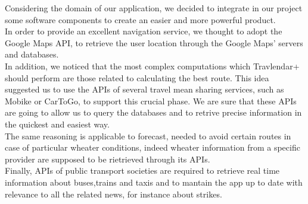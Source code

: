 
	Considering the domain of our application, we  decided to integrate in our project some software components to create an easier and more powerful product. 
	\\In order to provide an excellent navigation service, we thought to adopt the Google Maps API, to retrieve the user location through the Google Maps' servers and databases. 
	\\In addition, we noticed that the most complex computations which Travlendar+ should perform are those related to calculating the best route. This idea suggested us to use the APIs of several travel mean sharing services, such as Mobike or CarToGo, 
	to support this crucial phase. We are sure that these APIs are going to allow us to query the databases and to retrive precise information in the quickest and easiest way.
	\\The same reasoning is applicable to forecast, needed to avoid certain routes in case of particular wheater conditions, indeed wheater information from a specific provider are supposed to be rietrieved through its APIs. 
	\\Finally, APIs of public transport societies are required to retrieve real time information about buses,trains and taxis and to mantain the app up to date with relevance to all the related news, for instance about strikes. 
	
